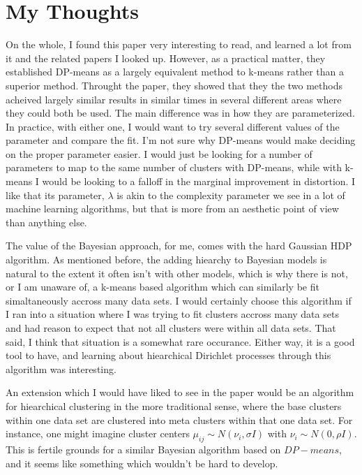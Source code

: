 \documentclass[11pt]{article}
\theoremstyle{definition}
\begin{document}
\section{My Thoughts}
On the whole, I found this paper very interesting to read, and learned a lot from it and the related papers I looked up. However, as a practical matter, they established DP-means as a largely equivalent method to k-means rather than a superior method. Throught the paper, they showed that they the two methods acheived largely similar results in similar times in several different areas where they could both be used. The main difference was in how they are parameterized. In practice, with either one, I would want to try several different values of the parameter and compare the fit. I'm not sure why DP-means would make deciding on the proper parameter easier. I would just be looking for a number of parameters to map to the same number of clusters with DP-means, while with k-means I would be looking to a falloff in the marginal improvement in distortion. I like that its parameter, $\lambda$ is akin to the complexity parameter we see in a lot of machine learning algorithms, but that is more from an aesthetic point of view than anything else. \par
The value of the Bayesian approach, for me, comes with the hard Gaussian HDP algorithm. As mentioned before, the adding hiearchy to Bayesian models is natural to the extent it often isn't with other models, which is why there is not, or I am unaware of, a k-means based algorithm which can similarly be fit simaltaneously accross many data sets. I would certainly choose this algorithm if I ran into a situation where I was trying to fit clusters accross many data sets and had reason to expect that not all clusters were within all data sets. That said, I think that situation is a somewhat rare occurance. Either way, it is a good tool to have, and learning about hiearchical Dirichlet processes through this algorithm was interesting. \par
An extension which I would have liked to see in the paper would be an algorithm for hiearchical clustering in the more traditional sense, where the base clusters within one data set are clustered into meta clusters within that one data set. For instance, one might imagine cluster centers $\mu_{ij}\sim N(\nu_i,\sigma I)$ with $\nu_i\sim N(0,\rho I)$. This is fertile grounds for a similar Bayesian algorithm based on $DP-means$, and it seems like something which wouldn't be hard to develop.
\end{document}
